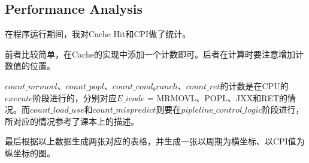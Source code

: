 \subsection{Performance Analysis}

在程序运行期间，我对Cache Hit和CPI做了统计。

前者比较简单，在Cache的实现中添加一个计数即可。后者在计算时要注意增加计数值的位置。

$count\_mrmovl$、$count\_popl$、$count\_cond_branch$、$count\_ret$的计数是在CPU的{\bf $execute$}阶段进行的，分别对应$E\_icode$ = MRMOVL、POPL、JXX和RET的情况。而$count\_load\_use$和$count\_mispredict$则要在{\bf $pipleline\_control\_logic$}阶段进行，所对应的情况参考了课本上的描述。

最后根据以上数据生成两张对应的表格，并生成一张以周期为横坐标、以CPI值为纵坐标的图。